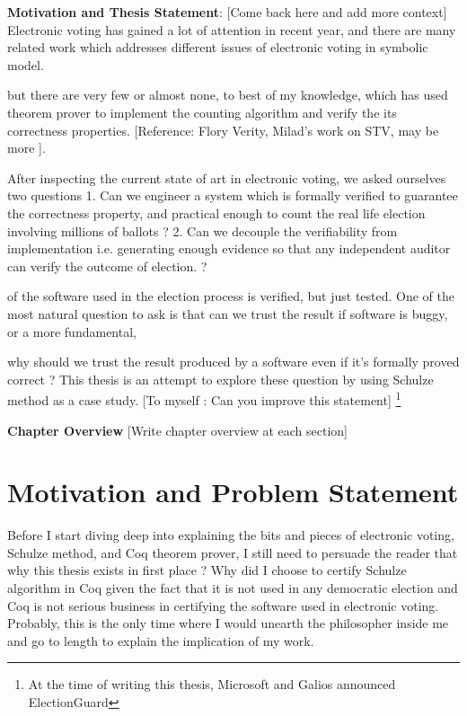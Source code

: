  \textbf{Motivation and Thesis Statement}:
 [Come back here and add more context]
 Electronic voting has gained a lot of attention in recent year, 
 and there are many related work which 
 addresses different issues of electronic voting in
 symbolic model.  
 
   
 but there are very few or almost none, to best of my knowledge, 
 which has used theorem prover to implement the counting algorithm 
 and verify the its correctness properties. 
 [Reference: Flory Verity, Milad's work on STV, may be more ].
 
   
 After inspecting the current state of art in electronic voting, we 
 asked ourselves two questions
 1. Can we engineer a system which is formally verified to 
    guarantee the correctness property, and practical enough
    to count the real life election involving millions of ballots ? 
 2. Can we decouple the verifiability from implementation i.e. 
    generating enough evidence so that any independent auditor can 
    verify the outcome of election. ? 
  
 
 of 
 the software used in the election process is verified, but just
 tested. One of the most natural question to ask is that 
 can we trust the result if software is buggy, or a more fundamental, 
 
 
 
 why should we trust the result produced by a software even 
 if it's formally proved correct ? This thesis is an attempt to 
 explore these question by using Schulze method as a case study.
 [To myself : Can you improve this statement]   
 \footnote{At the time of writing this thesis, Microsoft and Galios 
  announced ElectionGuard}
   
 
\textbf{Chapter Overview}
[Write chapter overview at each section]


\section{Motivation and Problem Statement}
	      
  Before I start diving deep into explaining the bits and pieces 
  of electronic voting, Schulze method, and Coq theorem prover, 
  I still need to persuade the reader that why this thesis 
  exists in first place ?  Why did I choose to certify Schulze 
  algorithm in Coq given the fact that it is not used in 
  any democratic election and Coq is not serious business
  in certifying the software used in electronic voting.  
  Probably, this is the only time where I would unearth 
  the philosopher inside me and go to length to explain 
  the implication of my work. 
  
